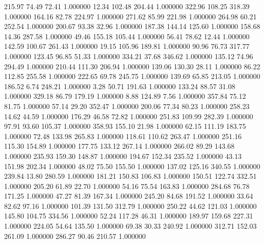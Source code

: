     215.97     74.49     72.41  1.000000
     12.34    102.48    204.44  1.000000
    322.96    108.25    318.39  1.000000
    164.16     82.78    224.97  1.000000
    271.62     85.99    221.98  1.000000
    264.98     60.21    252.54  1.000000
    200.67     93.38     32.96  1.000000
    187.38    144.14    125.60  1.000000
    158.68     14.36    287.58  1.000000
     49.46    155.18    105.44  1.000000
     56.41     78.62     12.44  1.000000
    142.59    100.67    261.43  1.000000
     19.15    105.96    189.81  1.000000
     90.96     76.73    317.77  1.000000
    123.45     96.85     51.33  1.000000
    334.21     37.68    346.62  1.000000
    135.12     74.96    294.49  1.000000
    210.44    111.30    206.94  1.000000
    139.06    130.30     28.11  1.000000
     86.22    112.85    255.58  1.000000
    222.65     69.78    245.75  1.000000
    139.69     65.85    213.05  1.000000
    186.52      6.74    248.21  1.000000
      3.28     50.71    191.63  1.000000
    133.24     88.57     31.08  1.000000
    329.18     86.79    179.19  1.000000
      8.88    124.89      7.56  1.000000
    357.84     75.12     81.75  1.000000
     57.14     29.20    352.47  1.000000
    200.06     77.34     80.23  1.000000
    258.23     14.62     44.59  1.000000
    176.29     46.58     72.82  1.000000
    251.83    109.99    282.39  1.000000
     97.91     93.60    105.37  1.000000
    358.93    155.10     21.98  1.000000
     62.15    111.19    183.75  1.000000
     72.48    133.98    265.83  1.000000
    118.61    110.62    263.47  1.000000
    251.16    115.30    154.89  1.000000
    177.75    133.12    267.14  1.000000
    266.02     89.29    143.68  1.000000
    235.93    159.30    148.87  1.000000
    194.67    152.34    235.52  1.000000
     43.13    151.98    202.34  1.000000
     48.02     75.50    155.50  1.000000
    137.02    125.16    340.55  1.000000
    239.84     13.80    280.59  1.000000
    181.21    150.83    106.83  1.000000
    150.51    122.74    332.51  1.000000
    205.20     61.89     22.70  1.000000
     54.16     75.54    163.83  1.000000
    284.68     76.78    171.25  1.000000
     47.27     81.39    167.34  1.000000
    245.20     84.68    191.52  1.000000
     33.64     82.62     97.16  1.000000
    101.39    131.50    312.79  1.000000
    250.22     44.62    121.03  1.000000
    145.80    104.75    334.56  1.000000
     52.24    117.28     46.31  1.000000
    189.97    159.68    227.31  1.000000
    224.05     54.64    135.50  1.000000
     69.38     30.33    240.92  1.000000
    312.71    152.03    261.09  1.000000
    286.27     90.46    210.57  1.000000
